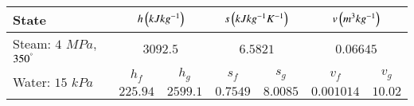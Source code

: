 \renewcommand{\arraystretch}{1.2}
  \begin{tabular}{|p{5cm}|c|c|c|c|c|c|}
    \hline
    State& \multicolumn{2}{c|}{$h \left(kJ kg^{-1}\right)$} & \multicolumn{2}{c|}{$s \left(kJ kg^{-1}K^{-1}\right)$} & \multicolumn{2}{c|}{$v \left(m^3kg^{-1}\right)$}\\
    \hline
    Steam: $4$ $MPa$, $350^\degree$ & \multicolumn{2}{c|}{$3092.5$} & \multicolumn{2}{c|}{$6.5821$} & \multicolumn{2}{c|}{$0.06645$}\\
    \hline
    \multirow{2}{5cm}{Water: $15$ $kPa$ } & $h_f$ & $h_g$ & $s_f$ & $s_g$ & $v_f$ & $v_g$ \\
    \cline{2-7} & $225.94$ & $2599.1$ & $0.7549$ & $8.0085$ & $0.001014$ & $10.02$ \\
    \hline
  \end{tabular}

